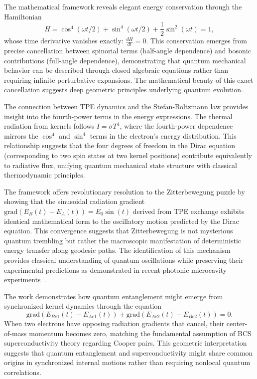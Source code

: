 \documentclass[%
 reprint,
 amsmath,amssymb,
 aps,
]{revtex4-1}
\numberwithin{equation}{section}%
\begin{document}
The mathematical framework reveals elegant energy conservation through the Hamiltonian 
\begin{equation}
H = \cos^4(\omega t/2) + \sin^4(\omega t/2) + \frac{1}{2}\sin^2(\omega t) = 1,
\end{equation}
whose time derivative vanishes exactly: $\frac{dH}{dt} = 0$. This conservation emerges from precise cancellation between spinorial terms (half-angle dependence) and bosonic contributions (full-angle dependence), demonstrating that quantum mechanical behavior can be described through closed algebraic equations rather than requiring infinite perturbative expansions. The mathematical beauty of this exact cancellation suggests deep geometric principles underlying quantum evolution.

The connection between TPE dynamics and the Stefan-Boltzmann law provides insight into the fourth-power terms in the energy expressions. The thermal radiation from kernels follows $I = \sigma T^4$, where the fourth-power dependence mirrors the $\cos^4$ and $\sin^4$ terms in the electron's energy distribution. This relationship suggests that the four degrees of freedom in the Dirac equation (corresponding to two spin states at two kernel positions) contribute equivalently to radiative flux, unifying quantum mechanical state structure with classical thermodynamic principles.

The framework offers revolutionary resolution to the Zitterbewegung puzzle by showing that the sinusoidal radiation gradient $\text{grad}(E_B(t) - E_A(t)) = E_0\sin(t)$ derived from TPE exchange exhibits identical mathematical form to the oscillatory motion predicted by the Dirac equation. This convergence suggests that Zitterbewegung is not mysterious quantum trembling but rather the macroscopic manifestation of deterministic energy transfer along geodesic paths. The identification of this mechanism provides classical understanding of quantum oscillations while preserving their experimental predictions as demonstrated in recent photonic microcavity experiments~\cite{walker2013}.

The work demonstrates how quantum entanglement might emerge from synchronized kernel dynamics through the equation
\begin{equation}
\text{grad}(E_{Be1}(t) - E_{Ae1}(t)) + \text{grad}(E_{Ae2}(t) - E_{Be2}(t)) = 0.
\end{equation}
When two electrons have opposing radiation gradients that cancel, their center-of-mass momentum becomes zero, matching the fundamental assumption of BCS superconductivity theory regarding Cooper pairs. This geometric interpretation suggests that quantum entanglement and superconductivity might share common origins in synchronized internal motions rather than requiring nonlocal quantum correlations.
\end{document}
